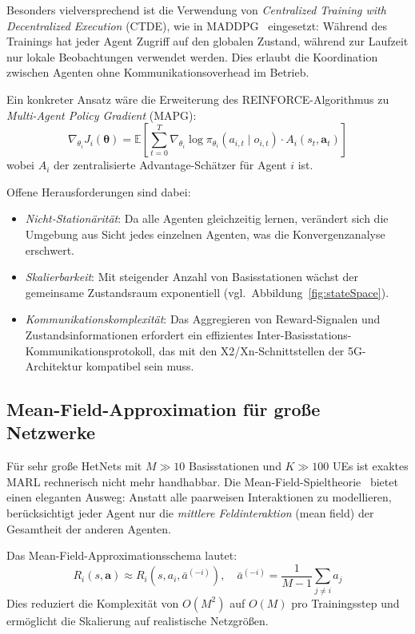 ﻿\documentclass[a4paper,12pt]{article}
\theoremstyle{definition}
\begin{document}
Besonders vielversprechend ist die Verwendung von \emph{Centralized Training with
Decentralized Execution} (CTDE), wie in MADDPG~\cite{lowe2017} eingesetzt:
W\"ahrend des Trainings hat jeder Agent Zugriff auf den globalen Zustand, w\"ahrend
zur Laufzeit nur lokale Beobachtungen verwendet werden. Dies erlaubt die Koordination
zwischen Agenten ohne Kommunikationsoverhead im Betrieb.

Ein konkreter Ansatz w\"are die Erweiterung des REINFORCE-Algorithmus zu
\emph{Multi-Agent Policy Gradient} (MAPG):
\[
  \nabla_{\theta_i} J_i(\boldsymbol{\theta}) =
  \mathbb{E}\!\left[\sum_{t=0}^{T} \nabla_{\theta_i} \log \pi_{\theta_i}(a_{i,t} \mid o_{i,t})
  \cdot A_i(s_t, \mathbf{a}_t)\right]
\]
wobei $A_i$ der zentralisierte Advantage-Sch\"atzer f\"ur Agent $i$ ist.

Offene Herausforderungen sind dabei:
\begin{itemize}
  \item \emph{Nicht-Station\"arit\"at}: Da alle Agenten gleichzeitig lernen, ver\"andert sich die
    Umgebung aus Sicht jedes einzelnen Agenten, was die Konvergenzanalyse erschwert.
  \item \emph{Skalierbarkeit}: Mit steigender Anzahl von Basisstationen w\"achst
    der gemeinsame Zustandsraum exponentiell (vgl.\ Abbildung~\ref{fig:stateSpace}).
  \item \emph{Kommunikationskomplexität}: Das Aggregieren von Reward-Signalen und
    Zustandsinformationen erfordert ein effizientes Inter-Basisstations-Kommunikationsprotokoll,
    das mit den X2/Xn-Schnittstellen der 5G-Architektur kompatibel sein muss.
\end{itemize}

\subsection{Mean-Field-Approximation für große Netzwerke}

F\"ur sehr gro\ss{}e HetNets mit $M \gg 10$ Basisstationen und $K \gg 100$ UEs
ist exaktes MARL rechnerisch nicht mehr handhabbar. Die Mean-Field-Spieltheorie~\cite{yang2018}
bietet einen eleganten Ausweg: Anstatt alle paarweisen Interaktionen zu modellieren,
ber\"ucksichtigt jeder Agent nur die \emph{mittlere Feldinteraktion} (mean field) der
Gesamtheit der anderen Agenten.

Das Mean-Field-Approximationsschema lautet:
\[
  R_i(s, \mathbf{a}) \approx R_i\!\left(s, a_i, \bar{a}^{(-i)}\right), \quad
  \bar{a}^{(-i)} = \frac{1}{M-1} \sum_{j \neq i} a_j
\]
Dies reduziert die Komplexit\"at von $O(M^2)$ auf $O(M)$ pro Trainingsstep und
erm\"oglicht die Skalierung auf realistische Netzgr\"o\ss{}en.
\end{document}

